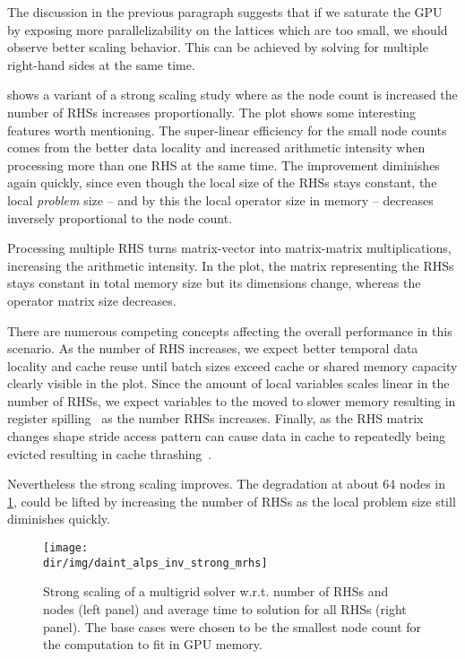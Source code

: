 The discussion in the previous paragraph suggests that if we saturate the GPU by exposing more parallelizability on the lattices which are too small, we should observe better scaling behavior.
This can be achieved by solving for multiple right-hand sides at the same time.

 shows a variant of a strong scaling study where as the node count is increased the number of RHSs increases proportionally.
The plot shows some interesting features worth mentioning.
The super-linear efficiency for the small node counts comes from the better data locality and increased arithmetic intensity when processing more than one RHS at the same time.
The improvement diminishes again quickly, since even though the local size of the RHSs stays constant, the local \emph{problem} size -- and by this the local operator size in memory -- decreases inversely proportional to the node count.

Processing multiple RHS turns matrix-vector into matrix-matrix multiplications, increasing the arithmetic intensity.
In the plot, the matrix representing the RHSs stays constant in total memory size but its dimensions change, whereas the operator matrix size decreases.

There are numerous competing concepts affecting the overall performance in this scenario.
As the number of RHS increases, we expect better temporal data locality and cache reuse until batch sizes exceed cache or shared memory capacity clearly visible in the plot.
Since the amount of local variables scales linear in the number of RHSs, we expect variables to the moved to slower memory resulting in register spilling~\cite{CHAITIN198147} as the number RHSs increases.
Finally, as the RHS matrix changes shape stride access pattern can cause data in cache to repeatedly being evicted resulting in cache thrashing~\cite{10.1145/1476589.1476705}.

Nevertheless the strong scaling improves.
The degradation at about \num{64} nodes in \cref{fig:daint:alps:inv:strong:mrhs}, could be lifted by increasing the number of RHSs as the local problem size still diminishes quickly.
\begin{figure}
\centering
\texttt{[image: \\dir/img/daint\_alps\_inv\_strong\_mrhs]}
\caption{
Strong scaling of a multigrid solver w.r.t. number of RHSs and nodes (left panel) and average time to solution for all RHSs (right panel).
The base cases were chosen to be the smallest node count for the computation to fit in GPU memory.
}
\label{fig:daint:alps:inv:strong:mrhs}
\end{figure}

